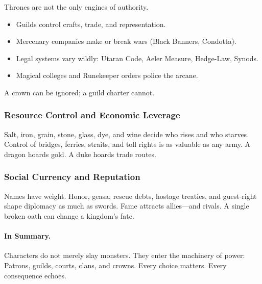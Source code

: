 Thrones are not the only engines of authority.
\begin{itemize}
    \item Guilds control crafts, trade, and representation.
    \item Mercenary companies make or break wars (Black Banners, Condotta).
    \item Legal systems vary wildly: Utaran Code, Aeler Measure, Hedge-Law, Synods.
    \item Magical colleges and Runekeeper orders police the arcane.
\end{itemize}
A crown can be ignored; a guild charter cannot.

\subsubsection{Resource Control and Economic Leverage}

Salt, iron, grain, stone, glass, dye, and wine decide who rises and who starves. Control of bridges, ferries, straits, and toll rights is as valuable as any army. A dragon hoards gold. A duke hoards trade routes.

\subsubsection{Social Currency and Reputation}

Names have weight. Honor, geasa, rescue debts, hostage treaties, and guest-right shape diplomacy as much as swords. Fame attracts allies---and rivals. A single broken oath can change a kingdom's fate.

\paragraph{In Summary.}
Characters do not merely slay monsters. They enter the machinery of power: Patrons, guilds, courts, clans, and crowns. Every choice matters. Every consequence echoes.

